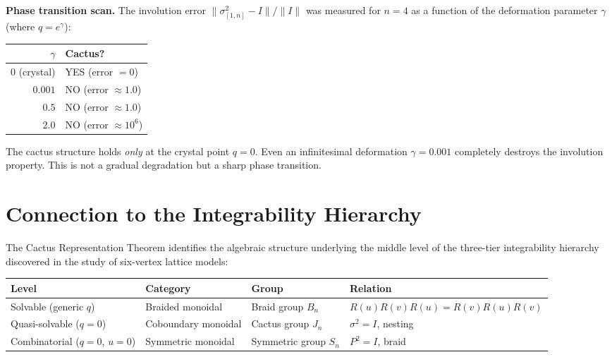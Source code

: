 \documentclass[11pt]{article}
\theoremstyle{remark}
\begin{document}
\textbf{Phase transition scan.}
The involution error $\|\sigma_{[1,n]}^2 - I\|/\|I\|$ was measured for
$n = 4$ as a function of the deformation parameter $\gamma$
(where $q = e^\gamma$):

\begin{center}
\begin{tabular}{@{}rl@{}}
  \toprule
  $\gamma$ & Cactus? \\
  \midrule
  $0$ (crystal) & YES (error $= 0$) \\
  $0.001$ & NO (error $\approx 1.0$) \\
  $0.5$ & NO (error $\approx 1.0$) \\
  $2.0$ & NO (error $\approx 10^6$) \\
  \bottomrule
\end{tabular}
\end{center}

\noindent
The cactus structure holds \emph{only} at the crystal point $q = 0$.
Even an infinitesimal deformation $\gamma = 0.001$ completely destroys
the involution property. This is not a gradual degradation but a sharp
phase transition.

\section{Connection to the Integrability Hierarchy}

The Cactus Representation Theorem identifies the algebraic structure
underlying the middle level of the three-tier integrability hierarchy
discovered in the study of six-vertex lattice models:

\begin{center}
\renewcommand{\arraystretch}{1.3}
\begin{tabular}{@{}llll@{}}
  \toprule
  Level & Category & Group & Relation \\
  \midrule
  Solvable (generic $q$) & Braided monoidal & Braid group $B_n$
    & $R(u)R(v)R(u) = R(v)R(u)R(v)$ \\
  Quasi-solvable ($q = 0$) & Coboundary monoidal & Cactus group $J_n$
    & $\sigma^2 = I$, nesting \\
  Combinatorial ($q = 0$, $u = 0$) & Symmetric monoidal & Symmetric group $S_n$
    & $P^2 = I$, braid \\
  \bottomrule
\end{tabular}
\end{center}
\end{document}
